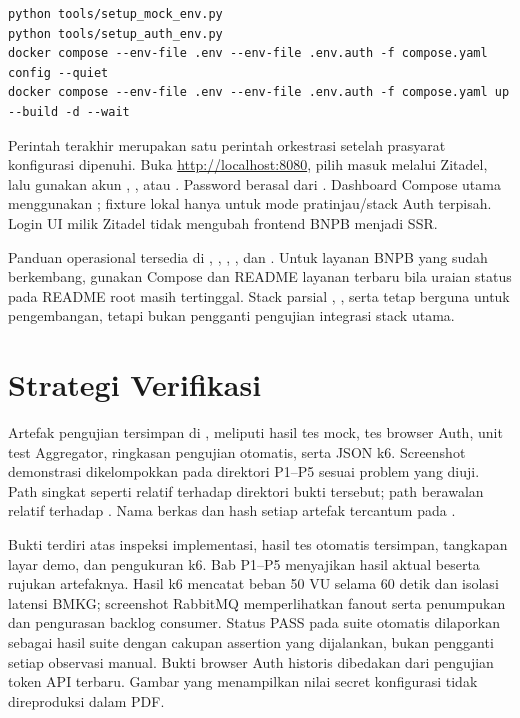 \begin{lstlisting}
python tools/setup_mock_env.py
python tools/setup_auth_env.py
docker compose --env-file .env --env-file .env.auth -f compose.yaml config --quiet
docker compose --env-file .env --env-file .env.auth -f compose.yaml up --build -d --wait
\end{lstlisting}

Perintah terakhir merupakan satu perintah orkestrasi setelah prasyarat konfigurasi dipenuhi. Buka \url{http://localhost:8080}, pilih masuk melalui Zitadel, lalu gunakan akun , , atau . Password berasal dari . Dashboard Compose utama menggunakan ; fixture lokal hanya untuk mode pratinjau/stack Auth terpisah. Login UI milik Zitadel tidak mengubah frontend BNPB menjadi SSR.

Panduan operasional tersedia di , , , , dan . Untuk layanan BNPB yang sudah berkembang, gunakan Compose dan README layanan terbaru bila uraian status pada README root masih tertinggal. Stack parsial , , serta  tetap berguna untuk pengembangan, tetapi bukan pengganti pengujian integrasi stack utama.

\section{Strategi Verifikasi}
Artefak pengujian tersimpan di , meliputi hasil tes mock, tes browser Auth, unit test Aggregator, ringkasan pengujian otomatis, serta JSON k6. Screenshot demonstrasi dikelompokkan pada direktori P1--P5 sesuai problem yang diuji. Path singkat seperti  relatif terhadap direktori bukti tersebut; path berawalan  relatif terhadap . Nama berkas dan hash setiap artefak tercantum pada .

Bukti terdiri atas inspeksi implementasi, hasil tes otomatis tersimpan, tangkapan layar demo, dan pengukuran k6. Bab P1--P5 menyajikan hasil aktual beserta rujukan artefaknya. Hasil k6 mencatat beban 50 VU selama 60 detik dan isolasi latensi BMKG; screenshot RabbitMQ memperlihatkan fanout serta penumpukan dan pengurasan backlog consumer. Status PASS pada suite otomatis dilaporkan sebagai hasil suite dengan cakupan assertion yang dijalankan, bukan pengganti setiap observasi manual. Bukti browser Auth historis dibedakan dari pengujian token API terbaru. Gambar yang menampilkan nilai secret konfigurasi tidak direproduksi dalam PDF.
